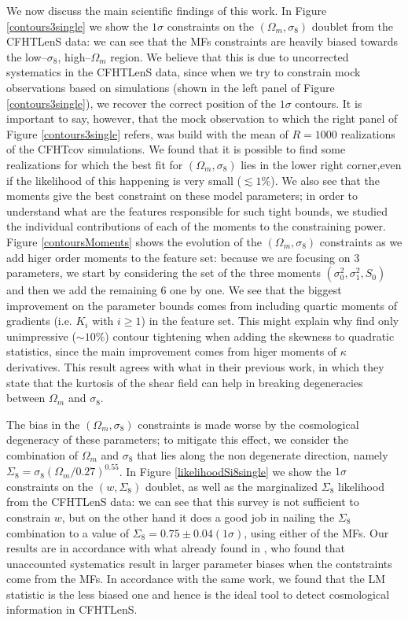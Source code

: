 \documentclass[reprint,aps,prd,superscriptaddress,showkeys,showpacs]{revtex4-1}
\begin{document}
We now discuss the main scientific findings of this work. In Figure \ref{contours3single} we show the $1\sigma$ constraints on the $(\Omega_m,\sigma_8)$ doublet from the CFHTLenS data: we can see that the MFs constraints are heavily biased towards the low--$\sigma_8$, high--$\Omega_m$ region. We believe that this is due to uncorrected systematics in the CFHTLenS data, since when we try to constrain mock observations based on simulations (shown in the left panel of Figure \ref{contours3single}), we recover the correct position of the $1\sigma$ contours. It is important to say, however, that the mock observation to which the right panel of Figure \ref{contours3single} refers, was build with the mean of $R=1000$ realizations of the CFHTcov simulations. We found that it is possible to find some realizations for which the best fit for $(\Omega_m,\sigma_8)$ lies in the lower right corner,even if the likelihood of this happening is very small ($\lesssim1\%$). We also see that the moments give the best constraint on these model parameters; in order to understand what are the features responsible for such tight bounds, we studied the individual contributions of each of the moments to the constraining power. Figure \ref{contoursMoments} shows the evolution of the $(\Omega_m,\sigma_8)$ constraints as we add higer order moments to the feature set: because we are focusing on 3 parameters, we start by considering the set of the three moments $(\sigma_0^2,\sigma_1^2,S_0)$ and then we add the remaining 6 one by one. We see that the biggest improvement on the parameter bounds comes from including quartic moments of gradients (i.e. $K_i$ with $i\ge1$) in the feature set. This might explain why \citep{CFHTFu} find only unimpressive ($\sim10\%$) contour tightening when adding the skewness to quadratic statistics, since the main improvement comes from higer moments of $\kappa$ derivatives. This result agrees with what \citep{BhuvKurtosis} in their previous work, in which they state that the kurtosis of the shear field can help in breaking degeneracies between $\Omega_m$ and $\sigma_8$.   

The bias in the $(\Omega_m,\sigma_8)$ constraints is made worse by the cosmological degeneracy of these parameters; to mitigate this effect, we consider the combination of $\Omega_m$ and $\sigma_8$ that lies along the non degenerate direction, namely $\Sigma_8=\sigma_8(\Omega_m/0.27)^{0.55}$. In Figure \ref{likelihoodSi8single} we show the $1\sigma$ constraints on the $(w,\Sigma_8)$ doublet, as well as the marginalized $\Sigma_8$ likelihood from the CFHTLenS data: we can see that this survey is not sufficient to constrain $w$, but on the other hand it does a good job in nailing the $\Sigma_8$ combination to a value of $\Sigma_8=0.75\pm0.04(1\sigma)$, using either of the MFs. Our results are in accordance with what already found in \citep{PetriSpurious}, who found that unaccounted systematics result in larger parameter biases when the contstraints come from the MFs. In accordance with the same work, we found that the LM statistic is the less biased one and hence is the ideal tool to detect cosmological information in CFHTLenS. 
\end{document}
